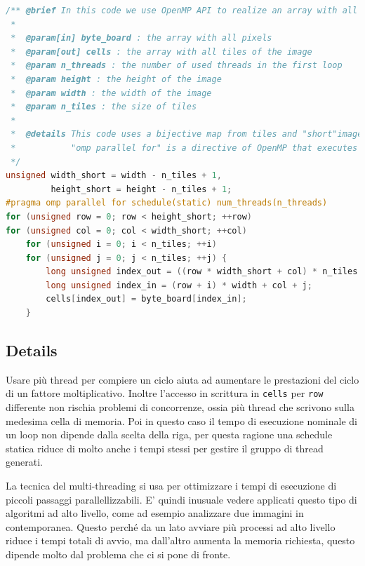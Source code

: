 \begin{toDo}
\begin{lstlisting}[style=code, language=C, rulecolor=\color{blue}]
/** @brief In this code we use OpenMP API to realize an array with all tiles.
 *
 *  @param[in] byte_board : the array with all pixels
 *  @param[out] cells : the array with all tiles of the image
 *  @param n_threads : the number of used threads in the first loop
 *  @param height : the height of the image
 *  @param width : the width of the image
 *  @param n_tiles : the size of tiles
 *
 *  @details This code uses a bijective map from tiles and "short"image, i.e. an image with shape width_short, height_short. Each tiles will be assigned to its first pixel (up/sx).
 *           "omp parallel for" is a directive of OpenMP that executes a for cycle using more indipendent threads. In this case the schedule is "static" i.e. each thread knows in advance all its loops.
 */
unsigned width_short = width - n_tiles + 1,
         height_short = height - n_tiles + 1;
#pragma omp parallel for schedule(static) num_threads(n_threads)
for (unsigned row = 0; row < height_short; ++row)
for (unsigned col = 0; col < width_short; ++col)
    for (unsigned i = 0; i < n_tiles; ++i)
    for (unsigned j = 0; j < n_tiles; ++j) {
        long unsigned index_out = ((row * width_short + col) * n_tiles + i) * n_tiles + j; // [row-i, col-j, i,j]
        long unsigned index_in = (row + i) * width + col + j;
        cells[index_out] = byte_board[index_in];
    }\end{lstlisting}

    \subsection{Details}
    Usare più \gls{thread} per compiere un ciclo aiuta ad aumentare le prestazioni del ciclo di un fattore moltiplicativo. Inoltre l'accesso in scrittura in \texttt{cells} per \texttt{row} differente non rischia problemi di concorrenze, ossia più \gls{thread} che scrivono sulla medesima cella di memoria. Poi in questo caso il tempo di esecuzione nominale di un loop non dipende dalla scelta della riga, per questa ragione una schedule statica riduce di molto anche i tempi stessi per gestire il gruppo di thread generati.

    \noindent La tecnica del multi-threading si usa per ottimizzare i tempi di esecuzione di piccoli passaggi parallellizzabili. E' quindi inusuale vedere applicati questo tipo di algoritmi ad alto livello, come ad esempio analizzare due immagini in contemporanea. Questo perché da un lato avviare più processi ad alto livello riduce i tempi totali di avvio, ma dall'altro aumenta la memoria richiesta, questo dipende molto dal problema che ci si pone di fronte.


\end{toDo}
